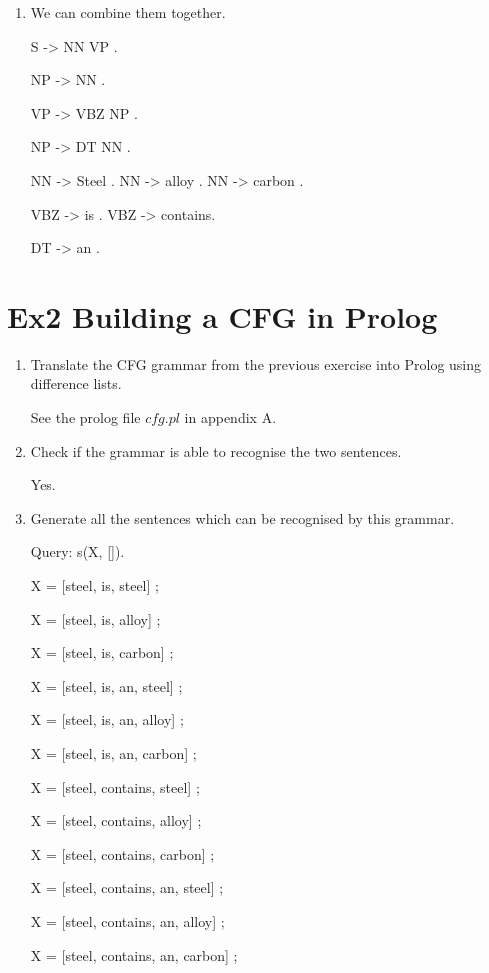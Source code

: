 \documentclass[12pt]{article}
\begin{document}
{\begin{enumerate}[1.]
    VBZ -> contains .
    
    NN -> carbon .

    \item We can combine them together.
    
    S -> NN VP .

    NP -> NN .

    VP -> VBZ NP .

    NP -> DT NN .

    NN -> Steel . NN -> alloy . NN -> carbon .

    VBZ -> is . VBZ -> contains.

    DT -> an .

\end{enumerate}

\newpage
\section{Ex2 Building a CFG in Prolog}
\label{sec: ex2}
\begin{enumerate}[1.]
    \item Translate the CFG grammar from the previous exercise into Prolog using difference lists.
        
    See the prolog file $cfg.pl$ in appendix A.
    \item Check if the grammar is able to recognise the two sentences.
        
    Yes.
    \item Generate all the sentences which can be recognised by this grammar.
    
    Query: s(X, []).
    
    X = [steel, is, steel] ;

    X = [steel, is, alloy] ;

    X = [steel, is, carbon] ;

    X = [steel, is, an, steel] ;

    X = [steel, is, an, alloy] ;

    X = [steel, is, an, carbon] ;

    X = [steel, contains, steel] ;

    X = [steel, contains, alloy] ;

    X = [steel, contains, carbon] ;

    X = [steel, contains, an, steel] ;

    X = [steel, contains, an, alloy] ;

    X = [steel, contains, an, carbon] ;


\end{enumerate}}
\end{document}
